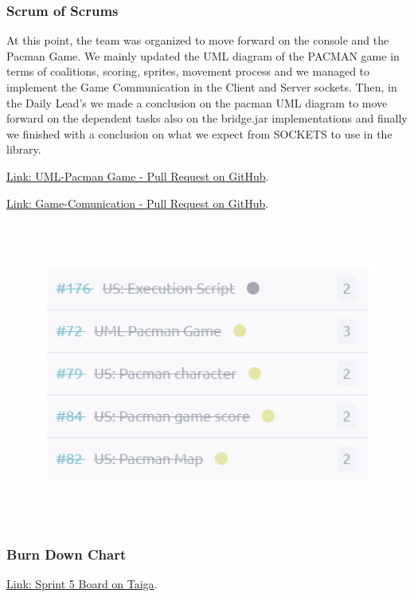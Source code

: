 
\hypertarget{sos-s3} {
\subsubsection{Scrum of Scrums}\label{Scrum of Scrums} 
At this point, the team was organized to move forward on the console and the Pacman Game.
We mainly updated the UML diagram of the PACMAN game in terms of coalitions, scoring, sprites, movement process and we managed to implement the Game Communication in the Client and Server sockets. Then, in the Daily Lead's we made a conclusion on the pacman UML diagram to move forward on the dependent tasks also on the bridge.jar implementations and finally we finished with a conclusion on what we expect from SOCKETS to use in the library. 
}

\href{https://github.com/Pending-Name-21/arquitecture/pull/11}{Link: UML-Pacman Game - Pull Request on GitHub}.

\href{https://github.com/Pending-Name-21/arquitecture/pull/17}{Link: Game-Comunication - Pull Request on GitHub}.

\begin{figure}
\centering
\includegraphics[width=16cm, height=10cm]{./artifacts/src/sprint-5/assets/US-Sprint5.png}
\end{figure}

\hypertarget{burndownchart-s3}{
\subsubsection{Burn Down Chart}\label{Burn Down Chart S3}}
\href{https://tree.taiga.io/project/joseluis-teran-coffeetime/taskboard/sprint-5-3817}{Link: Sprint 5 Board on Taiga}.


